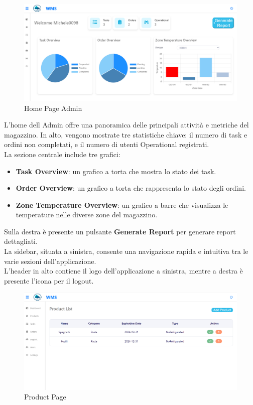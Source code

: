 \begin{figure}[H]
    \centering
    \includegraphics[width=\textwidth]{document/sections/img/Storyboard/homePageAdmin.png}
    \caption{Home Page Admin}
    \label{fig:homePageAdmins}
\end{figure}

L'home dell Admin offre una panoramica delle principali attività e metriche del magazzino.
In alto, vengono mostrate tre statistiche chiave: il numero di task e ordini non completati, e il numero di utenti
Operational registrati.\\

La sezione centrale include tre grafici:
\begin{itemize}
    \item \textbf{Task Overview}: un grafico a torta che mostra lo stato dei task.
    \item \textbf{Order Overview}: un grafico a torta che rappresenta lo stato degli ordini.
    \item \textbf{Zone Temperature Overview}: un grafico a barre che visualizza le temperature nelle diverse zone del magazzino.
\end{itemize}

Sulla destra è presente un pulsante \textbf{Generate Report} per generare report dettagliati.\\
La sidebar, situata a sinistra, consente una navigazione rapida e intuitiva tra le varie sezioni dell'applicazione.\\
L'header in alto contiene il logo dell'applicazione a sinistra, mentre a destra è presente l'icona per il logout.

\begin{figure}[H]
    \centering
    \includegraphics[width=\textwidth]{document/sections/img/Storyboard/productPage.png}
    \caption{Product Page}
    \label{fig:productPages}
\end{figure}

